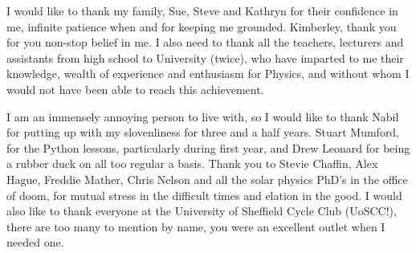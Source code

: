 
\begin{acknowledgements}      

I would like to thank my family, Sue, Steve and Kathryn for their confidence in me, infinite patience when and for keeping me grounded.
Kimberley, thank you for you non-stop belief in me.
I also need to thank all the teachers, lecturers and assistants from high school to University (twice), who have imparted to me their knowledge, wealth of experience and enthusiasm for Physics, and without whom I would not have been able to reach this achievement.

I am an immensely annoying person to live with, so I would like to thank Nabil for putting up with my slovenliness for three and a half years.
Stuart Mumford, for the Python lessons, particularly during first year, and Drew Leonard for being a rubber duck on all too regular a basis.
Thank you to Stevie Chaffin, Alex Hague, Freddie Mather, Chris Nelson and all the solar physics PhD's in the office of doom, for mutual stress in the difficult times and elation in the good. 
I would also like to thank everyone at the University of Sheffield Cycle Club (UoSCC!), there are too many to mention by name, you were an excellent outlet when I needed one.




\end{acknowledgements}
